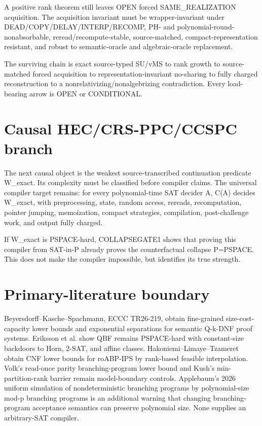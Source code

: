 \documentclass[11pt]{article}
\begin{document}
A positive rank theorem still leaves OPEN forced SAME_REALIZATION acquisition. The acquisition invariant must be wrapper-invariant under DEAD/COPY/DELAY/INTERP/RECOMP, PH- and polynomial-round-nonabsorbable, reread/recompute-stable, source-matched, compact-representation resistant, and robust to semantic-oracle and algebraic-oracle replacement.

The surviving chain is exact source-typed SU/vMS to rank growth to source-matched forced acquisition to representation-invariant no-sharing to fully charged reconstruction to a nonrelativizing/nonalgebrizing contradiction. Every load-bearing arrow is OPEN or CONDITIONAL.

\section*{Causal HEC/CRS-PPC/CCSPC branch}
The next causal object is the weakest source-transcribed continuation predicate W_exact. Its complexity must be classified before compiler claims. The universal compiler target remains: for every polynomial-time SAT decider A, C(A) decides W_exact, with preprocessing, state, random access, rereads, recomputation, pointer jumping, memoization, compact strategies, compilation, post-challenge work, and output fully charged.

If W_exact is PSPACE-hard, COLLAPSEGATE1 shows that proving this compiler from SAT-in-P already proves the counterfactual collapse P=PSPACE. This does not make the compiler impossible, but identifies its true strength.

\section*{Primary-literature boundary}
Beyersdorff--Kasche--Spachmann, ECCC TR26-219, obtain fine-grained size-cost-capacity lower bounds and exponential separations for semantic Q-k-DNF proof systems. Eriksson et al. show QBF remains PSPACE-hard with constant-size backdoors to Horn, 2-SAT, and affine classes. Hakoniemi--Limaye--Tzameret obtain CNF lower bounds for roABP-IPS by rank-based feasible interpolation. Volk's read-once parity branching-program lower bound and Kush's min-partition-rank barrier remain model-boundary controls. Applebaum's 2026 uniform simulation of nondeterministic branching programs by polynomial-size mod-p branching programs is an additional warning that changing branching-program acceptance semantics can preserve polynomial size. None supplies an arbitrary-SAT compiler.
\end{document}
